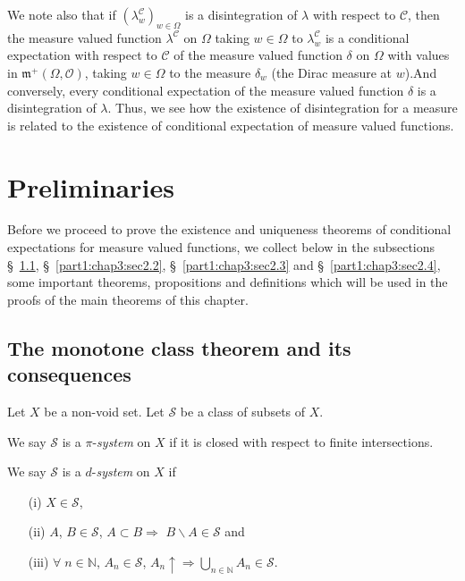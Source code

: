 We note also that if $(\lambda^\mathscr{C}_w)_{w \in\Omega}$ is a
disintegration of $\lambda$ with respect to $\mathscr{C}$, then the
measure valued function $\lambda^\mathscr{C}$ on $\Omega$ taking $w
\in \Omega$ to $\lambda^\mathscr{C}_w$ is a conditional expectation
with respect to $\mathscr{C}$ of the measure valued function $\delta$
on $\Omega$ with values in $\mathfrak{m}^+ (\Omega, \mathscr{O})$,
taking $w \in \Omega$ to the measure $\delta_w$ (the Dirac measure at
$w$).\pageoriginale And conversely, every conditional expectation of
the measure valued function $\delta$ is a disintegration of
$\lambda$. Thus, we see how the existence of disintegration for
a measure is related to the existence of conditional expectation of
measure valued functions. 

\section{Preliminaries}\label{part1:chap3:sec2}

Before we proceed to prove the existence and uniqueness theorems of
conditional expectations for measure valued functions, we collect
below in the subsections \S\ \ref{part1:chap3:sec2.1},
\S\ \ref{part1:chap3:sec2.2}, \S\ \ref{part1:chap3:sec2.3} and
\S\ \ref{part1:chap3:sec2.4}, some  
important theorems, propositions and definitions which will be used
in the proofs of the main theorems of this chapter. 

\subsection{The monotone class theorem and its
  consequences}\label{part1:chap3:sec2.1}

Let $X$ be a non-void set. Let $\mathscr{S}$ be a class of subsets of
$X$. 

We say $\mathscr{S}$ is a $\pi$-{\em system} on $X$ if it is closed
with respect to finite intersections. 

We say $\mathscr{S}$ is a $d$-{\em system} on $X$ if 
\begin{itemize}
\item[{\rm (i)}] $X \in \mathscr{S}$, 

\item[{\rm (ii)}] $A$, $B \in \mathscr{S}$, $A \subset B \Rightarrow$
  $B \backslash A \in \mathscr{S}$  and 

\item[{\rm (iii)}] $\forall \; n \in \mathbb{N}$, $A_n \in
  \mathscr{S}$, $A_n \uparrow \Rightarrow \bigcup\limits_{n
    \in\mathbb{N}} A_n \in \mathscr{S}$. 
\end{itemize}

